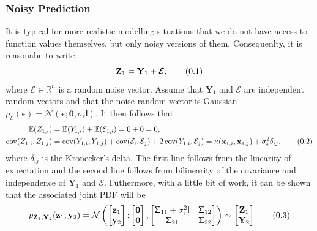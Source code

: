 \documentclass[10pt]{article}
\theoremstyle{definition}
\theoremstyle{definition}
\theoremstyle{remark}
\newcommand\eqnum{\addtocounter{equation}{1}\tag{\arabic{section}.\arabic{equation}}}
\DeclareMathOperator{\cov}{cov}
\begin{document}
\subsubsection{Noisy Prediction}
It is typical for more realistic modelling situations that we do not have access to function values themselves, but only noisy versions of them. Consequenlty, it is reasonabe to write
\begin{equation*}
\mathbf{Z}_{1} = \mathbf{Y}_{1} + \boldsymbol{\mathcal{E}},
\eqnum
\end{equation*}
where $\boldsymbol{\mathcal{E}}\in\mathbb{R}^n$ is a random noise vector. Assume that $\mathbf{Y}_1$ and $\boldsymbol{\mathcal{E}}$ are independent random vectors and that the noise random vector is Gaussian $p_{\boldsymbol{\mathcal{E}}}(\boldsymbol{\epsilon})=\mathcal{N}(\boldsymbol{\epsilon}; \mathbf{0}, \sigma_{\epsilon}\mathsf{I})$. It then follows that
 \begin{align*}
 \mathbb{E}(Z_{1,i}) &=  \mathbb{E}(Y_{1,i}) +  \mathbb{E}(\mathcal{E}_{1,i}) = 0 + 0 = 0, \\
 \cov(Z_{1,i},Z_{1,j}) &=  \cov(Y_{1,i},Y_{1,j}) +  \cov(\mathcal{E}_{i},\mathcal{E}_{j}) + 2 \cov(Y_{1,i},\mathcal{E}_{j}) = 
 \kappa(\mathbf{x}_{1,i}, \mathbf{x}_{1,j}) + \sigma_{\epsilon}^2\delta_{ij},
 \eqnum
 \end{align*}
where $\delta_{ij}$ is the Kronecker's delta. The first line follows from the linearity of expectation and the second line follows from bilinearity of the covariance and independence of $\mathbf{Y}_1$ and $\boldsymbol{\mathcal{E}}$. Futhermore, with a little bit of work, it can be shown that the associated joint PDF will be \cite[Sectoin 4.3]{Murphy2012}
\begin{equation*}
p_{\mathbf{Z}_{1}, \mathbf{Y}_{2}}(\mathbf{z}_{1}, \mathbf{y}_{2}) =
\mathcal{N} \left(
\begin{bmatrix}
\mathbf{z}_1 \\
\mathbf{y}_2
\end{bmatrix} ;
\begin{bmatrix}
\mathbf{0} \\
\mathbf{0}
\end{bmatrix} ,
\begin{bmatrix}
\mathsf{\Sigma}_{11}+\sigma_{\epsilon}^2\mathsf{I} & \mathsf{\Sigma}_{12} \\
\mathsf{\Sigma}_{21} & \mathsf{\Sigma}_{22} 
\end{bmatrix}
\right) \sim
\begin{bmatrix}
\mathbf{Z}_1 \\
\mathbf{Y}_2
\end{bmatrix}
\eqnum
\label{eq:GP:noise:joint}
\end{equation*}
\end{document}
